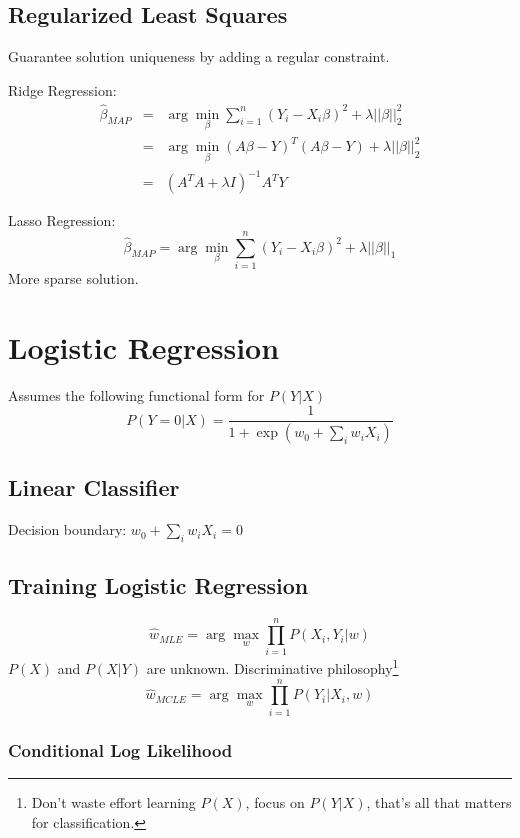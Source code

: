 \documentclass[letterpaper, 10pt, twocolumn]{article}
\begin{document}
\subsection{Regularized Least Squares}

Guarantee solution uniqueness by adding a regular constraint.

Ridge Regression:
\begin{equation}
\begin{array}{rcl}
\hat{\beta}_{MAP} & = & \arg\min_{\beta}\sum_{i=1}^{n}(Y_i-X_i\beta)^2+\lambda ||\beta||_2^2 \\
				  & = & \arg\min_{\beta}(A\beta-Y)^T(A\beta-Y) + \lambda||\beta||_2^2 \\
				  & = & (A^TA+\lambda I)^{-1}A^TY
\end{array}
\end{equation}

Lasso Regression:
$$\hat{\beta}_{MAP} = \arg\min_{\beta}\sum_{i=1}^{n}(Y_i-X_i\beta)^2+\lambda ||\beta||_1 $$
More sparse solution.

\newpage

\section{Logistic Regression}

Assumes the following functional form for $P(Y|X)$
$$P(Y=0|X)=\frac{1}{1+\exp(w_0+\sum_i w_iX_i)}$$

\subsection{Linear Classifier}

Decision boundary: $w_0+\sum_i w_iX_i = 0$

\subsection{Training Logistic Regression}

$$\hat{w}_{MLE} = \arg\max_w \prod_{i=1}^{n} P(X_i,Y_i|w)$$
$P(X)$ and $P(X|Y)$ are unknown. Discriminative philosophy\footnote{Don't waste effort learning $P(X)$, focus on $P(Y|X)$, that's all that matters for classification.}
$$\hat{w}_{MCLE} = \arg\max_w \prod_{i=1}^{n} P(Y_i|X_i,w)$$

\subsubsection{Conditional Log Likelihood}
\end{document}
